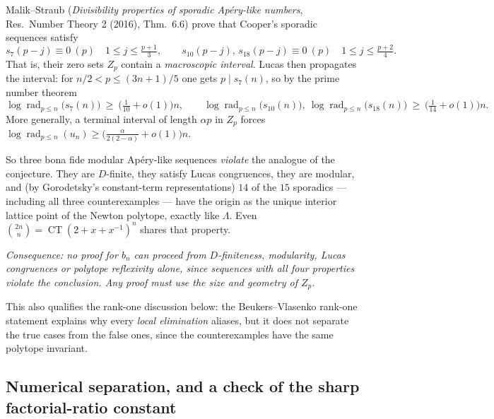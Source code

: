 Malik--Straub (\emph{Divisibility properties of sporadic Ap\'ery-like numbers}, Res.\ Number
Theory 2 (2016), Thm.~6.6) prove that Cooper's sporadic sequences satisfy
\[
  s_7(p-j)\equiv0\ (p)\quad 1\le j\le\tfrac{p+1}3,\qquad
  s_{10}(p-j),\,s_{18}(p-j)\equiv0\ (p)\quad 1\le j\le\tfrac{p+2}4 .
\]
That is, their zero sets $Z_p$ contain a \emph{macroscopic interval}.  Lucas then propagates
the interval: for $n/2<p\le(3n+1)/5$ one gets $p\mid s_7(n)$, so by the prime number theorem
\[
  \log\operatorname{rad}_{p\le n}\bigl(s_7(n)\bigr)\ \ge\ \bigl(\tfrac1{10}+o(1)\bigr)n,
  \qquad
  \log\operatorname{rad}_{p\le n}\bigl(s_{10}(n)\bigr),\ \log\operatorname{rad}_{p\le n}
  \bigl(s_{18}(n)\bigr)\ \ge\ \bigl(\tfrac1{14}+o(1)\bigr)n .
\]
More generally, a terminal interval of length $\alpha p$ in $Z_p$ forces
$\log\operatorname{rad}_{p\le n}(u_n)\ge\bigl(\frac\alpha{2(2-\alpha)}+o(1)\bigr)n$.

So three bona fide modular Ap\'ery-like sequences \emph{violate} the analogue of the
conjecture.  They are $D$-finite, they satisfy Lucas congruences, they are modular, and (by
Gorodetsky's constant-term representations) $14$ of the $15$ sporadics — including all three
counterexamples — have the origin as the unique interior lattice point of the Newton
polytope, exactly like $\Lambda$.  Even $\binom{2n}n=\operatorname{CT}(2+x+x^{-1})^n$ shares
that property.

\begin{center}\emph{Consequence: no proof for $b_n$ can proceed from $D$-finiteness,
modularity, Lucas congruences or polytope reflexivity alone, since sequences with all four
properties violate the conclusion.  Any proof must use the size and geometry of $Z_p$.}
\end{center}

This also qualifies the rank-one discussion below: the Beukers--Vlasenko rank-one statement
explains why every \emph{local elimination} aliases, but it does not separate the true cases
from the false ones, since the counterexamples have the same polytope invariant.

\subsection{Numerical separation, and a check of the sharp factorial-ratio constant}

